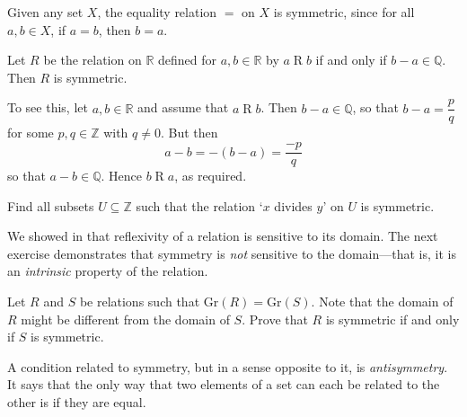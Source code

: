 \begin{center}
\end{center}

\begin{example}
\label{exEqualityIsSymmetric}
Given any set $X$, the equality relation $=$ on $X$ is symmetric, since for all $a,b \in X$, if $a=b$, then $b=a$.
\end{example}

\begin{example}
\label{exDifferenceOfRealsInQIsSymmetric}
Let $R$ be the relation on $\mathbb{R}$ defined for $a,b \in \mathbb{R}$ by $a \mathrel{R} b$ if and only if $b-a \in \mathbb{Q}$. Then $R$ is symmetric.

To see this, let $a,b \in \mathbb{R}$ and assume that $a \mathrel{R} b$. Then $b-a \in \mathbb{Q}$, so that $b-a = \dfrac{p}{q}$ for some $p,q \in \mathbb{Z}$ with $q \ne 0$. But then
\[ a-b = -(b-a) = \dfrac{-p}{q} \]
so that $a-b \in \mathbb{Q}$. Hence $b \mathrel{R} a$, as required.
\end{example}

\begin{exercise}
Find all subsets $U \subseteq \mathbb{Z}$ such that the relation `$x$ divides $y$' on $U$ is symmetric.
\end{exercise}

We showed in  that reflexivity of a relation is sensitive to its domain. The next exercise demonstrates that symmetry is \textit{not} sensitive to the domain---that is, it is an \textit{intrinsic} property of the relation.

\begin{exercise}
\label{exSymmetryNotSensitiveToDomainOfRelation}
Let $R$ and $S$ be relations such that $\mathrm{Gr}(R) = \mathrm{Gr}(S)$. Note that the domain of $R$ might be different from the domain of $S$. Prove that $R$ is symmetric if and only if $S$ is symmetric.
\end{exercise}

A condition related to symmetry, but in a sense opposite to it, is \textit{antisymmetry}. It says that the only way that two elements of a set can each be related to the other is if they are equal.

